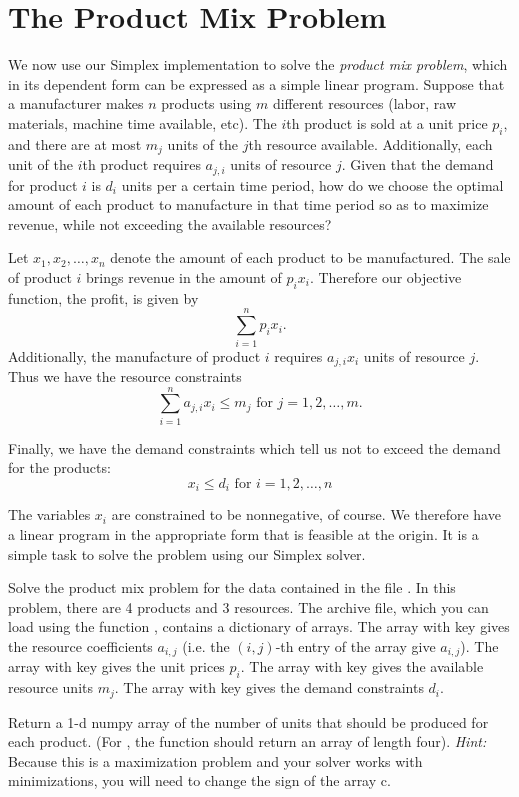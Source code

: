 \section*{The Product Mix Problem}
We now use our Simplex implementation to solve the \emph{product mix problem}, which in its dependent form can be expressed as a simple linear program.
Suppose that a manufacturer makes $n$ products using $m$ different resources (labor, raw materials, machine time available, etc).
The $i$th product is sold at a unit price $p_i$, and there are at most $m_j$ units
of the $j$th resource available.
Additionally, each unit of the $i$th product requires $a_{j,i}$ units of resource $j$.
Given that the demand for product $i$ is $d_i$ units per a certain time period, how do we choose the optimal amount
of each product to manufacture in that time period so as to maximize revenue, while not exceeding the available resources?

Let  $x_1, x_2, \ldots, x_n$ denote the amount of each product to be manufactured.
The sale of product $i$ brings revenue in the amount of $p_ix_i$.
Therefore our objective function, the profit, is given by
\[
\sum_{i=1}^n p_ix_i.
\]
Additionally, the manufacture of product $i$ requires $a_{j,i}x_i$ units of resource $j$.
Thus we have the resource constraints
\[
\sum_{i=1}^n a_{j,i}x_i \leq m_j  \text{ for } j = 1, 2, \ldots, m.
\]

Finally, we have the demand constraints which tell us not to exceed the demand for the products:
\[
x_i \leq d_i \text{ for } i = 1, 2, \ldots, n
\]

The variables $x_i$ are constrained to be nonnegative, of course.
We therefore have a linear program in the appropriate form that is feasible at the origin.
It is a simple task to solve the problem using our Simplex solver.

\begin{problem} %
Solve the product mix problem for the data contained in the file .
In this problem, there are 4 products and 3 resources.
The archive file, which you can load using the function
, contains a dictionary of arrays.
The array with key  gives the resource coefficients $a_{i,j}$ (i.e. the $(i,j)$-th entry of the array give $a_{i,j}$).
The array with key  gives the unit prices $p_i$.
The array with key  gives the available resource
units $m_j$.
The array with key  gives the demand constraints $d_i$.


Return a 1-d numpy array of the number of units that should be produced for each product.
(For , the function should return an array of length four).
\emph{Hint:} Because this is a maximization problem and your solver works with minimizations, you will need to change the sign of the array c.
\end{problem}

